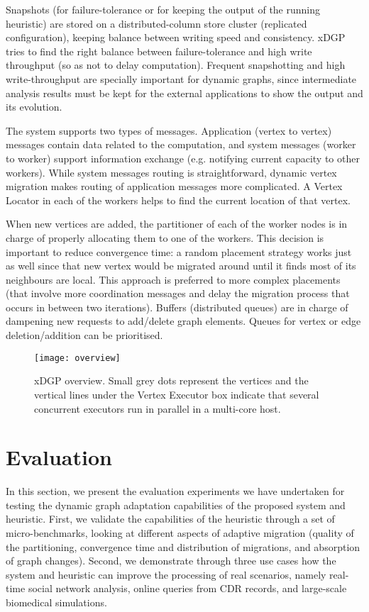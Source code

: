 \documentclass{sig-alternate-10pt}
\begin{document}
Snapshots (for failure-tolerance or for keeping the output of the running heuristic) are stored on a distributed-column store cluster (replicated configuration), keeping balance between writing speed and consistency. xDGP tries to find the right balance between failure-tolerance and high write throughput (so as not to delay computation). Frequent snapshotting and high write-throughput are specially important for dynamic graphs, since intermediate analysis results must be kept for the external applications to show the output and its evolution.

The system supports two types of messages. Application (vertex to vertex) messages contain data related to the computation, and system messages (worker to worker) support information exchange (e.g. notifying current capacity to other workers). While system messages routing is straightforward, dynamic vertex migration makes routing of application messages more complicated. A Vertex Locator in each of the workers helps to find the current location of that vertex.

When new vertices are added, the partitioner of each of the worker nodes is in charge of properly allocating them to one of the workers. This decision is important to reduce convergence time: a random placement strategy works just as well since that new vertex would be migrated around until it finds most of its neighbours are local. This approach is preferred to more complex placements (that involve more coordination messages and delay the migration process that occurs in between two iterations). Buffers (distributed queues) are in charge of dampening new requests to add/delete graph elements. Queues for vertex or edge deletion/addition can be prioritised.

\begin{figure*}
\centering
\texttt{[image: overview]}
\caption{ xDGP overview. Small grey dots represent the vertices and the vertical lines under the Vertex Executor box indicate that several concurrent executors run in parallel in a multi-core host.}
\label{fig:overview}

\end{figure*}



\section{Evaluation}
\label{sec:eval}

In this section, we present the evaluation experiments we have undertaken for testing the dynamic graph adaptation capabilities of the proposed system and heuristic. First, we validate the capabilities of the heuristic through a set of micro-benchmarks, looking at different aspects of adaptive migration (quality of the partitioning, convergence time and distribution of migrations, and absorption of graph changes). Second, we demonstrate through three use cases how the system and heuristic can improve the processing of real scenarios, namely real-time social network analysis, online queries from CDR records, and large-scale biomedical simulations.
\end{document}
